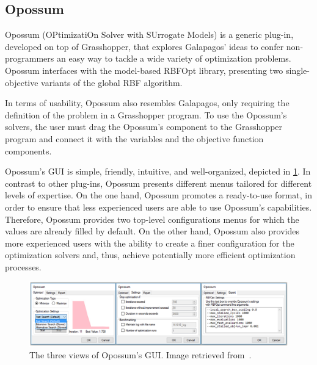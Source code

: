 %		
	
	\subsection{Opossum}
	Opossum (OPtimizatiOn Solver with SUrrogate Models) is a generic plug-in, developed on top of Grasshopper, that explores Galapagos' ideas to confer non-programmers an easy way to tackle a wide variety of optimization problems. Opossum interfaces with the model-based RBFOpt library, presenting two single-objective variants of the global \ac{RBF} algorithm. 
	
	In terms of usability, Opossum also resembles Galapagos, only requiring the definition of the problem in a Grasshopper program. To use the Opossum's solvers, the user must drag the Opossum's component to the Grasshopper program and connect it with the variables and the objective function components.
	
	Opossum's \ac{GUI} is simple, friendly, intuitive, and well-organized, depicted in \cref{fig:opossum}. In contrast to other plug-ins, Opossum presents different menus tailored for different levels of expertise. On the one hand, Opossum promotes a ready-to-use format, in order to ensure that less experienced users are able to use Opossum's capabilities. Therefore, Opossum provides two top-level configurations menus for which the values are already filled by default. On the other hand, Opossum also provides more experienced users with the ability to create a finer configuration for the optimization solvers and, thus, achieve potentially more efficient optimization processes. 
	
	\begin{figure}
		\centering
		\includegraphics[width=1\textwidth]{Images/Background/Opossum/opossum_1.png}
		\caption[Opossum GUI]{The three views of Opossum's \ac{GUI}. Image retrieved from~\cite{Wortmann2017Opossum}.}
		\label{fig:opossum}
	\end{figure}
	
